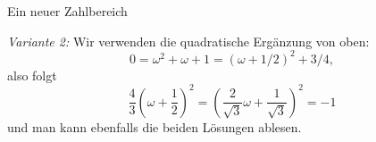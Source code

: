\documentclass{algblatt}
\begin{document}
\begin{aufgabe}{Ein neuer Zahlbereich}
\begin{loesungE}
\emph{Variante 2:} Wir verwenden die quadratische Ergänzung von oben:
\[ 0 = \omega^2 + \omega + 1 = (\omega + 1/2)^2 + 3/4, \]
also folgt
\[ \frac{4}{3} \left(\omega + \frac{1}{2}\right)^2 = \left(
  \frac{2}{\sqrt{3}} \omega + \frac{1}{\sqrt{3}}
\right)^2 = -1 \]
und man kann ebenfalls die beiden Lösungen ablesen.
\end{loesungE}
\end{aufgabe}
\end{document}
